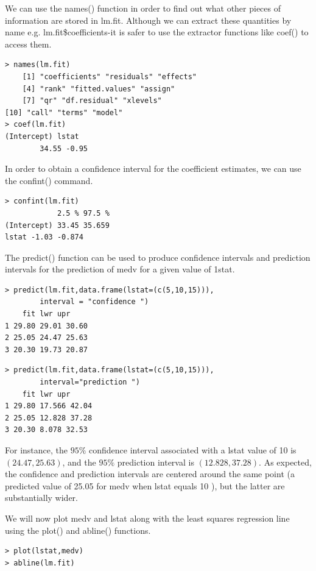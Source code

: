 \documentclass[10pt]{article}
\begin{document}
We can use the names() function in order to find out what other pieces of information are stored in lm.fit. Although we can extract these quantities by name e.g. lm.fit\$coefficients-it is safer to use the extractor functions like coef() to access them.

\begin{verbatim}
> names(lm.fit)
    [1] "coefficients" "residuals" "effects"
    [4] "rank" "fitted.values" "assign"
    [7] "qr" "df.residual" "xlevels"
[10] "call" "terms" "model"
> coef(lm.fit)
(Intercept) lstat
        34.55 -0.95
\end{verbatim}

In order to obtain a confidence interval for the coefficient estimates, we can use the confint() command.

\begin{verbatim}
> confint(lm.fit)
            2.5 % 97.5 %
(Intercept) 33.45 35.659
lstat -1.03 -0.874
\end{verbatim}

The predict() function can be used to produce confidence intervals and prediction intervals for the prediction of medv for a given value of 1stat.

\begin{verbatim}
> predict(lm.fit,data.frame(lstat=(c(5,10,15))),
        interval = "confidence ")
    fit lwr upr
1 29.80 29.01 30.60
2 25.05 24.47 25.63
3 20.30 19.73 20.87
\end{verbatim}

\begin{verbatim}
> predict(lm.fit,data.frame(lstat=(c(5,10,15))),
        interval="prediction ")
    fit lwr upr
1 29.80 17.566 42.04
2 25.05 12.828 37.28
3 20.30 8.078 32.53
\end{verbatim}

For instance, the $95 \%$ confidence interval associated with a lstat value of 10 is $(24.47,25.63)$, and the $95 \%$ prediction interval is $(12.828,37.28)$. As expected, the confidence and prediction intervals are centered around the same point (a predicted value of 25.05 for medv when lstat equals 10 ), but the latter are substantially wider.

We will now plot medv and lstat along with the least squares regression line using the plot() and abline() functions.

\begin{verbatim}
> plot(lstat,medv)
> abline(lm.fit)
\end{verbatim}
\end{document}
